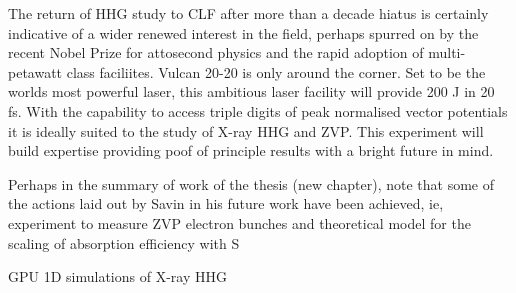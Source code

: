 The return of HHG study to CLF after more than a decade hiatus is certainly indicative of a wider renewed interest in the field, perhaps spurred on by the recent Nobel Prize for attosecond physics and the rapid adoption of multi-petawatt class faciliites. Vulcan 20-20 is only around the corner. Set to be the worlds most powerful laser, this ambitious laser facility will provide 200 J in 20 fs. With the capability to access triple digits of peak normalised vector potentials it is ideally suited to the study of X-ray HHG and ZVP. This experiment will build expertise providing poof of principle results with a bright future in mind.

Perhaps in the summary of work of the thesis (new chapter), note that some of the actions laid out by Savin in his future work have been achieved, ie, experiment to measure ZVP electron bunches and theoretical model for the scaling of absorption efficiency with S


GPU 1D simulations of X-ray HHG


